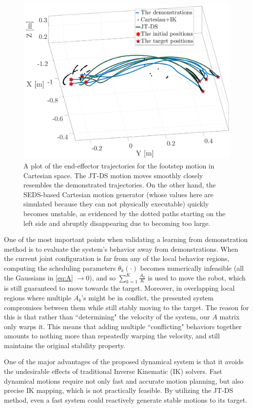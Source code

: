 \documentclass[letterpaper, 10 pt, conference,fleqn]{ieeeconf}
\begin{document}
\begin{figure}
\vspace{-10pt}
	\centering
	\includegraphics[width=0.8\linewidth]{Pic/Foot.pdf}
	\caption{A plot of the end-effector trajectories for the footstep motion in Cartesian space. The JT-DS motion moves smoothly closely resembles the demonstrated trajectories. On the other hand, the SEDS-based Cartesian motion generator (whose values here are simulated because they can not physically executable) quickly becomes unstable, as evidenced by the dotted paths starting on the left side and abruptly disappearing due to becoming too large. \label{fig:foot}}
	\vspace{-24pt}
\end{figure}

One of the most important points when validating a learning from demonstration method is to evaluate the system's behavior away from demonstrations. When the current joint configuration is far from any of the local behavior regions, computing the scheduling parameters $\theta_k(\cdot)$ becomes numerically infeasible (all the Gaussians in \eqref{eq:A} $\rightarrow 0$), and so $\sum\limits_{k=1}^{K}\frac{A_k}{K}$ is used to move the robot, which is still guaranteed to move towards the target. Moreover, in overlapping local regions where multiple $A_k$'s might be in conflict, the presented system compromises between them while still stably moving to the target. The reason for this is that rather than ``determining" the velocity of the system, our $A$ matrix only warps it. This means that adding multiple ``conflicting" behaviors together amounts to nothing more than repeatedly warping the velocity, and still maintains the original stability property. 

One of the major advantages of the proposed dynamical system is that it avoids the undesirable effects of traditional Inverse Kinematic (IK) solvers. Fast dynamical motions require not only fast and accurate motion planning, but also precise IK mapping, which is not practically feasible. By utilizing the JT-DS method, even a fast system could reactively generate stable motions to its target.
\end{document}

